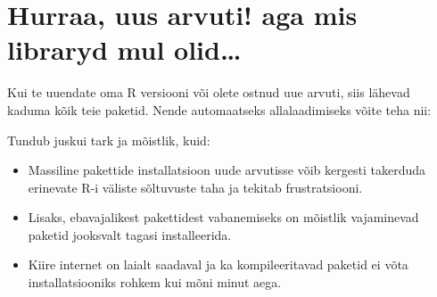 \documentclass[]{book}
\newenvironment{Shaded}{\begin{snugshade}}{\end{snugshade}}
\newcommand{\KeywordTok}[1]{\textcolor[rgb]{0.13,0.29,0.53}{\textbf{#1}}}
\newcommand{\StringTok}[1]{\textcolor[rgb]{0.31,0.60,0.02}{#1}}
\newcommand{\OperatorTok}[1]{\textcolor[rgb]{0.81,0.36,0.00}{\textbf{#1}}}
\newcommand{\NormalTok}[1]{#1}
\providecommand{\tightlist}{%
  \setlength{\itemsep}{0pt}\setlength{\parskip}{0pt}}
\begin{document}
\section{Hurraa, uus arvuti! aga mis libraryd mul
olid\ldots{}}\label{hurraa-uus-arvuti-aga-mis-libraryd-mul-olid}

Kui te uuendate oma R versiooni või olete ostnud uue arvuti, siis
lähevad kaduma kõik teie paketid. Nende automaatseks allalaadimiseks
võite teha nii:

\begin{Shaded}
\end{Shaded}

Tundub juskui tark ja mõistlik, kuid:

\begin{itemize}
\tightlist
\item
  Massiline pakettide installatsioon uude arvutisse võib kergesti
  takerduda erinevate R-i väliste sõltuvuste taha ja tekitab
  frustratsiooni.
\item
  Lisaks, ebavajalikest pakettidest vabanemiseks on mõistlik vajaminevad
  paketid jooksvalt tagasi installeerida.
\item
  Kiire internet on laialt saadaval ja ka kompileeritavad paketid ei
  võta installatsiooniks rohkem kui mõni minut aega.
\end{itemize}


\end{document}
